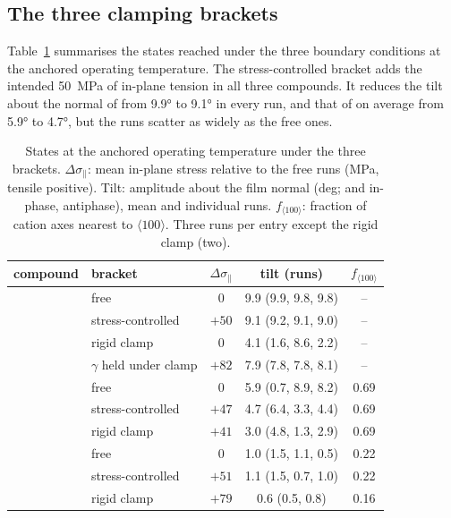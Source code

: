 \subsection{The three clamping brackets}
\label{sec:res-brackets}

Table~\ref{tab:brackets} summarises the states reached under the three boundary
conditions at the anchored operating temperature. The stress-controlled bracket adds the
intended \SI{50}{MPa} of in-plane tension in all three compounds. It reduces the tilt about
the normal of \CsSnI{} from \ang{9.9} to \ang{9.1} in every run, and that of \MASnI{} on
average from \ang{5.9} to \ang{4.7}, but the \MASnI{} runs scatter as widely as the free
ones.

\begin{table}[htbp]
  \centering
  \caption{States at the anchored operating temperature under the three brackets. $\Delta
    \sigma_\parallel$: mean in-plane stress relative to the free runs (MPa, tensile
    positive). Tilt: amplitude about the film normal (deg; \CsSnI{} and \FASnI{} in-phase,
    \MASnI{} antiphase), mean and individual runs. $f_{\langle100\rangle}$: fraction of
    cation axes nearest to $\langle100\rangle$. Three runs per entry except the \FASnI{}
    rigid clamp (two).}
  \label{tab:brackets}
  \begin{tabular}{llccc}
    \toprule
    compound & bracket & $\Delta\sigma_\parallel$ & tilt (runs) & $f_{\langle100\rangle}$ \\
    \midrule
    \CsSnI{} & free & 0 & 9.9 (9.9, 9.8, 9.8) & -- \\
             & stress-controlled & $+50$ & 9.1 (9.2, 9.1, 9.0) & -- \\
             & rigid clamp & $0$ & 4.1 (1.6, 8.6, 2.2) & -- \\
             & $\gamma$ held under clamp & $+82$ & 7.9 (7.8, 7.8, 8.1) & -- \\
    \MASnI{} & free & 0 & 5.9 (0.7, 8.9, 8.2) & 0.69 \\
             & stress-controlled & $+47$ & 4.7 (6.4, 3.3, 4.4) & 0.69 \\
             & rigid clamp & $+41$ & 3.0 (4.8, 1.3, 2.9) & 0.69 \\
    \FASnI{} & free & 0 & 1.0 (1.5, 1.1, 0.5) & 0.22 \\
             & stress-controlled & $+51$ & 1.1 (1.5, 0.7, 1.0) & 0.22 \\
             & rigid clamp & $+79$ & 0.6 (0.5, 0.8) & 0.16 \\
    \bottomrule
  \end{tabular}
\end{table}

